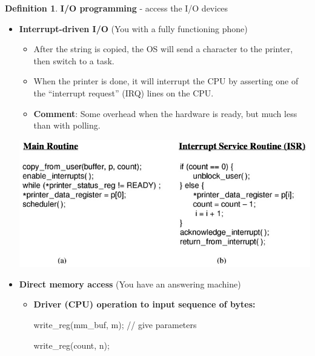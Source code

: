 \documentclass[11pt,a4paper]{article}
\theoremstyle{definition}
\newtheorem{definition}{Definition}[section]
\newenvironment{myitemize}
{ \begin{itemize}
    \setlength{\itemsep}{5pt}
    \setlength{\parskip}{0pt}
    \setlength{\parsep}{0pt}     }
{ \end{itemize}                  }
\begin{document}
\begin{definition}{\textbf{I/O programming} - access the I/O devices}
\begin{myitemize}
		\textbf{Issue}: It takes perhaps 10ms to print a character. During this time, the CPU will be busy-waiting until the printer is done printing. On a 3.2 GHz processor this is equivalent to wasting 320,000,000 instructions! Extremely inefficient use of CPU as most polls are likely to fail. On the other hand not polling risks losing data. 


		\item \textbf{Interrupt-driven I/O} (You with a fully functioning phone)

		\begin{minipage}{0.35\linewidth}
		\begin{myitemize}
			\item After the string is copied, the OS will send a character to the printer, then switch to a task.
			\item When the printer is done, it will interrupt the CPU by asserting one of the “interrupt request” (IRQ) lines on the CPU.
			\item \textbf{Comment}: Some overhead when the hardware is ready, but much less than with polling.
		\end{myitemize}
		\end{minipage}\hspace{5mm}
		\begin{minipage}{0.6\linewidth}
			\includegraphics[width=\linewidth]{m3/InterruptIO}
		\end{minipage}
		
		\item \textbf{Direct memory access} (You have an answering machine)
		\begin{myitemize}
			\item \textbf{Driver (CPU) operation to input sequence of bytes:}
			\begin{tcolorbox}
			
				write\_reg(mm\_buf, m);     // give parameters
			
			write\_reg(count, n);
			

\end{tcolorbox}
\end{myitemize}
\end{myitemize}
\end{definition}
\end{document}
